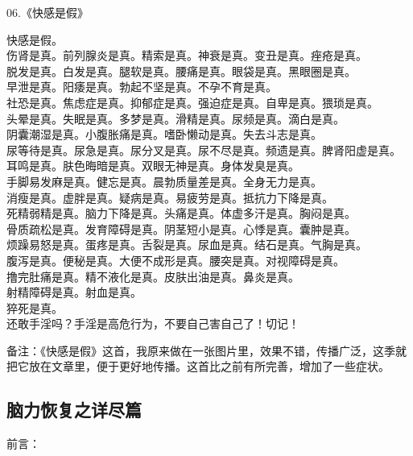 \begin{center}
    06.《快感是假》\it

    快感是假。 \\ 伤肾是真。前列腺炎是真。精索是真。神衰是真。变丑是真。痤疮是真。 \\ 脱发是真。白发是真。腿软是真。腰痛是真。眼袋是真。黑眼圈是真。 \\ 早泄是真。阳痿是真。勃起不坚是真。不孕不育是真。 \\ 社恐是真。焦虑症是真。抑郁症是真。强迫症是真。自卑是真。猥琐是真。 \\ 头晕是真。失眠是真。多梦是真。滑精是真。尿频是真。滴白是真。 \\ 阴囊潮湿是真。小腹胀痛是真。嗜卧懒动是真。失去斗志是真。 \\ 尿等待是真。尿急是真。尿分叉是真。尿不尽是真。频遗是真。脾肾阳虚是真。 \\ 耳鸣是真。肤色晦暗是真。双眼无神是真。身体发臭是真。 \\ 手脚易发麻是真。健忘是真。晨勃质量差是真。全身无力是真。 \\ 消瘦是真。虚胖是真。疑病是真。易疲劳是真。抵抗力下降是真。 \\ 死精弱精是真。脑力下降是真。头痛是真。体虚多汗是真。胸闷是真。 \\ 骨质疏松是真。发育障碍是真。阴茎短小是真。心悸是真。囊肿是真。 \\ 烦躁易怒是真。蛋疼是真。舌裂是真。尿血是真。结石是真。气胸是真。 \\ 腹泻是真。便秘是真。大便不成形是真。腰突是真。对视障碍是真。 \\ 撸完肚痛是真。精不液化是真。皮肤出油是真。鼻炎是真。 \\ 射精障碍是真。射血是真。 \\ 猝死是真。 \\ 还敢手淫吗？手淫是高危行为，不要自己害自己了！切记！
\end{center}

备注：《快感是假》这首，我原来做在一张图片里，效果不错，传播广泛，这季就把它放在文章里，便于更好地传播。这首比之前有所完善，增加了一些症状。

\subsection{脑力恢复之详尽篇}

前言：

